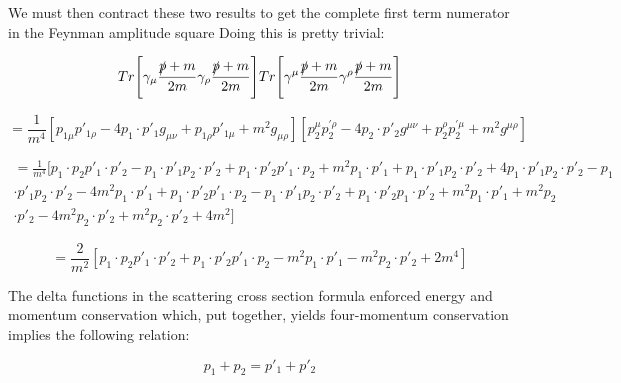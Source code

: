 \documentclass[a4]{article}
\begin{document}
    \begin{center}
    \end{center}

    We must then contract these two results to get the complete first term numerator in the Feynman amplitude square Doing this is pretty trivial: 

    \begin{equation}
        Tr \Bigg[ \gamma_{\mu} \frac{\slashed{p} + m}{2m} \gamma_{\rho} \frac{\slashed{p} + m}{2m} \Bigg] Tr \Bigg[ \gamma^{\mu} \frac{\slashed{p} + m}{2m} \gamma^{\rho} \frac{\slashed{p} + m}{2m} \Bigg]
    \end{equation}

    \begin{equation}
        = \frac{1}{m^4} [p_{1 \mu} p'_{1 \rho} - 4 p_1 \cdot p'_1 g_{\mu \nu} + p_{1 \rho} p'_{1 \mu} + m^2 g_{\mu \rho}] [p_{2}^{\mu} p_{2}^{' \rho} - 4 p_2 \cdot p'_2 g^{\mu \nu} + p_{2}^{\rho} p_{2}^{' \mu} + m^2 g^{\mu \rho}]
    \end{equation}

    \begin{eqnarray}
        = \frac{1}{m^4} [p_1 \cdot p_2 p'_1 \cdot p'_2 - p_1 \cdot p'_1 p_2 \cdot p'_2 + p_1 \cdot p'_2 p'_1 \cdot p_2 + m^2 p_1 \cdot p'_1 + p_1 \cdot p'_1 p_2 \cdot p'_2 + 4 p_1 \cdot p'_1 p_2 \cdot p'_2 - p_1 \\
        \cdot p'_1 p_2 \cdot p'_2 - 4 m^2 p_1 \cdot p'_1 + p_1 \cdot p'_2 p'_1 \cdot p_2 - p_1 \cdot p'_1 p_2 \cdot p'_2 + p_1 \cdot p'_2 p_1 \cdot p'_2 + m^2 p_1 \cdot p'_1 + m^2 p_2 \\
        \cdot p'_2 - 4 m^2 p_2 \cdot p'_2 + m^2 p_2 \cdot p'_2 + 4 m^2]
    \end{eqnarray}

    \begin{equation}
        = \frac{2}{m^2} [p_1 \cdot p_2 p'_1 \cdot p'_2 + p_1 \cdot p'_2 p'_1 \cdot p_2 - m^2 p_1 \cdot p'_1 - m^2 p_2 \cdot p'_2 + 2 m^4]
    \end{equation}

    The delta functions in the scattering cross section formula enforced energy and momentum conservation which, put together, yields four-momentum conservation implies the following relation:

    \begin{equation}
        p_1 + p_2 = p'_1 + p'_2
    \end{equation}
\end{document}
